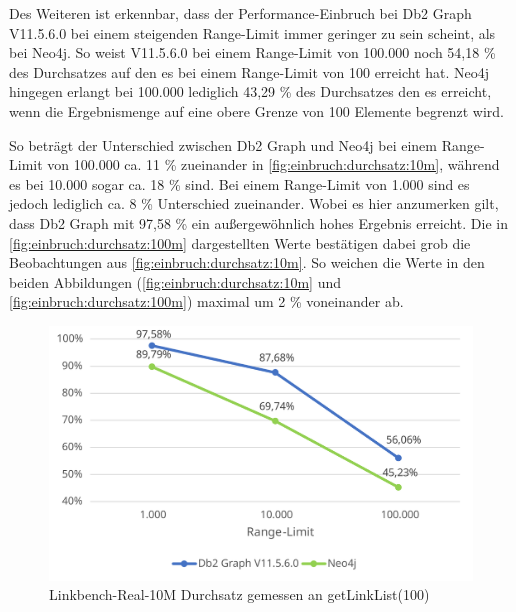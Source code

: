 Des Weiteren ist erkennbar, dass der Performance-Einbruch bei Db2 Graph V11.5.6.0 bei einem steigenden Range-Limit immer geringer zu sein scheint, als bei Neo4j. So weist V11.5.6.0 bei einem Range-Limit von 100.000 noch 54,18 \% des Durchsatzes auf den es bei einem Range-Limit von 100 erreicht hat. Neo4j hingegen erlangt bei 100.000 lediglich 43,29 \% des Durchsatzes den es erreicht, wenn die Ergebnismenge auf eine obere Grenze von 100 Elemente begrenzt wird. 

So beträgt der Unterschied zwischen Db2 Graph und Neo4j bei einem Range-Limit von 100.000 ca. 11 \% zueinander in \autoref{fig:einbruch:durchsatz:10m}, während es bei 10.000 sogar ca. 18 \% sind. Bei einem Range-Limit von 1.000 sind es jedoch lediglich ca. 8 \% Unterschied zueinander. Wobei es hier anzumerken gilt, dass Db2 Graph mit 97,58 \% ein außergewöhnlich hohes Ergebnis erreicht. Die in \autoref{fig:einbruch:durchsatz:100m} dargestellten Werte bestätigen dabei grob die Beobachtungen aus \autoref{fig:einbruch:durchsatz:10m}. So weichen die Werte in den beiden Abbildungen (\autoref{fig:einbruch:durchsatz:10m} und \autoref{fig:einbruch:durchsatz:100m}) maximal um 2 \% voneinander ab. 

\begin{figure}[!ht]
    \centering
    \includegraphics[width=\textwidth]{images/diagramme/limit_relative_durchsatz_real_10m.pdf}
    \caption{Linkbench-Real-10M Durchsatz gemessen an getLinkList(100)}
    \label{fig:einbruch:durchsatz:10m}
\end{figure}

